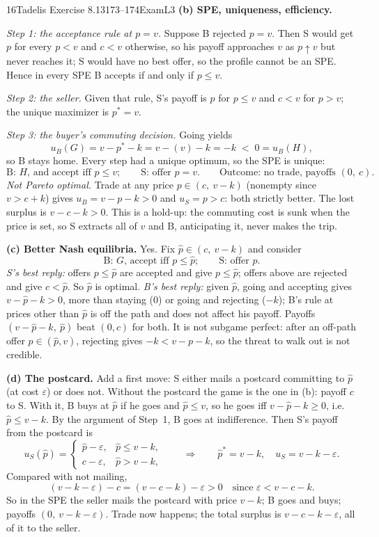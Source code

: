 \begin{exsol}{16}{Tadelis Exercise 8.13}{173--174}{Exam}{L3}
\textbf{(b) SPE, uniqueness, efficiency.}

\emph{Step 1: the acceptance rule at $p = v$.} Suppose B rejected $p = v$. Then S would get $p$
for every $p < v$ and $c < v$ otherwise, so his payoff approaches $v$ as $p \uparrow v$ but never
reaches it; S would have no best offer, so the profile cannot be an SPE. Hence in every SPE B
accepts if and only if $p \le v$.

\emph{Step 2: the seller.} Given that rule, S's payoff is $p$ for $p \le v$ and $c < v$ for
$p > v$; the unique maximizer is $p^* = v$.

\emph{Step 3: the buyer's commuting decision.} Going yields
\[
  u_B(G) = v - p^* - k = v - (v) - k = -k \;<\; 0 = u_B(H),
\]
so B stays home. Every step had a unique optimum, so the SPE is unique:
\[
  \text{B: } H\text{, and accept iff } p \le v;\qquad \text{S: offer } p = v. \qquad
  \text{Outcome: no trade, payoffs } (0,\ c).
\]
\emph{Not Pareto optimal.} Trade at any price $p \in (c,\ v - k)$ (nonempty since $v > c+k$)
gives $u_B = v - p - k > 0$ and $u_S = p > c$: both strictly better. The lost surplus is
$v - c - k > 0$. This is a hold-up: the commuting cost is sunk when the price is set, so S
extracts all of $v$ and B, anticipating it, never makes the trip.

\textbf{(c) Better Nash equilibria.} Yes. Fix $\hat p \in (c,\ v - k)$ and consider
\[
  \text{B: } G\text{, accept iff } p \le \hat p;\qquad \text{S: offer } \hat p .
\]
\emph{S's best reply:} offers $p \le \hat p$ are accepted and give $p \le \hat p$; offers above are
rejected and give $c < \hat p$. So $\hat p$ is optimal. \emph{B's best reply:} given $\hat p$,
going and accepting gives $v - \hat p - k > 0$, more than staying (0) or going and rejecting
($-k$); B's rule at prices other than $\hat p$ is off the path and does not affect his payoff.
Payoffs $(v - \hat p - k,\ \hat p)$ beat $(0, c)$ for both. It is not subgame perfect: after an
off-path offer $p \in (\hat p, v)$, rejecting gives $-k < v - p - k$, so the threat to walk out
is not credible.

\textbf{(d) The postcard.} Add a first move: S either mails a postcard committing to $\hat p$ (at
cost $\varepsilon$) or does not. Without the postcard the game is the one in (b): payoff $c$ to S.
With it, B buys at $\hat p$ if he goes and $\hat p \le v$, so he goes iff
$v - \hat p - k \ge 0$, i.e.\ $\hat p \le v - k$. By the argument of Step~1, B goes at
indifference. Then S's payoff from the postcard is
\[
  u_S(\hat p) = \begin{cases} \hat p - \varepsilon, & \hat p \le v - k,\\
  c - \varepsilon, & \hat p > v - k, \end{cases}
  \qquad\Rightarrow\qquad \hat p^* = v - k,\quad u_S = v - k - \varepsilon .
\]
Compared with not mailing,
\[
  (v - k - \varepsilon) - c = (v - c - k) - \varepsilon > 0
  \quad\text{since } \varepsilon < v - c - k .
\]
So in the SPE the seller mails the postcard with price $v - k$; B goes and buys; payoffs
$(0,\ v - k - \varepsilon)$. Trade now happens; the total surplus is $v - c - k - \varepsilon$, all
of it to the seller.


\end{exsol}
